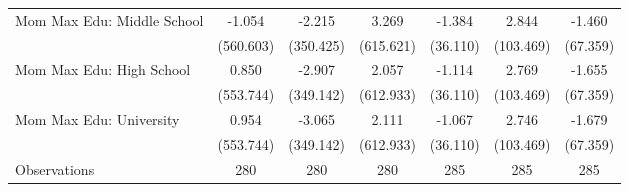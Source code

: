 {\begin{tabular}{l*{6}{c}}
\addlinespace
Mom Max Edu: Middle School&      -1.054         &      -2.215         &       3.269         &      -1.384         &       2.844         &      -1.460         \\
                    &   (560.603)         &   (350.425)         &   (615.621)         &    (36.110)         &   (103.469)         &    (67.359)         \\
\addlinespace
Mom Max Edu: High School&       0.850         &      -2.907         &       2.057         &      -1.114         &       2.769         &      -1.655         \\
                    &   (553.744)         &   (349.142)         &   (612.933)         &    (36.110)         &   (103.469)         &    (67.359)         \\
\addlinespace
Mom Max Edu: University&       0.954         &      -3.065         &       2.111         &      -1.067         &       2.746         &      -1.679         \\
                    &   (553.744)         &   (349.142)         &   (612.933)         &    (36.110)         &   (103.469)         &    (67.359)         \\
\midrule
Observations        &         280         &         280         &         280         &         285         &         285         &         285         \\
\bottomrule
\end{tabular}
}
